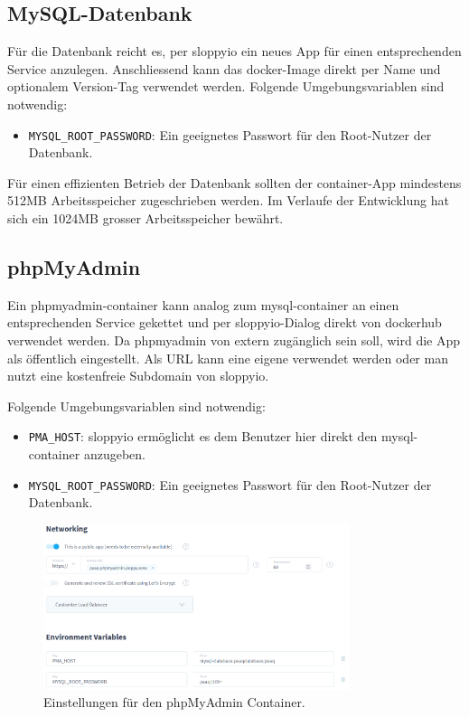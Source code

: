 \documentclass[../main.tex]{subfiles}
\begin{document}
	\subsection{MySQL-Datenbank}
	\par Für die Datenbank reicht es, per \gls{sloppyio} ein neues App für einen entsprechenden Service anzulegen. Anschliessend kann das \gls{docker}-Image direkt per Name und optionalem Version-Tag verwendet werden. Folgende Umgebungsvariablen sind notwendig:
	\begin{itemize}
		\item \texttt{MYSQL\_ROOT\_PASSWORD}: Ein geeignetes Passwort für den Root-Nutzer der Datenbank.
	\end{itemize}
	\par Für einen effizienten Betrieb der Datenbank sollten der \gls{container}-App mindestens 512MB Arbeitsspeicher zugeschrieben werden. Im Verlaufe der Entwicklung hat sich ein 1024MB grosser Arbeitsspeicher bewährt.
	
	\subsection{phpMyAdmin}
	\par Ein \gls{phpmyadmin}-\gls{container} kann analog zum \gls{mysql}-\gls{container} an einen entsprechenden Service gekettet und per \gls{sloppyio}-Dialog direkt von \gls{dockerhub} verwendet werden. Da \gls{phpmyadmin} von extern zugänglich sein soll, wird die App als öffentlich eingestellt. Als URL kann eine eigene verwendet werden oder man nutzt eine kostenfreie Subdomain von \gls{sloppyio}. 
	\par Folgende Umgebungsvariablen sind notwendig:
	\begin{itemize}
		\item \texttt{PMA\_HOST}: \gls{sloppyio} ermöglicht es dem Benutzer hier direkt den \gls{mysql}-\gls{container} anzugeben.
		\item \texttt{MYSQL\_ROOT\_PASSWORD}: Ein geeignetes Passwort für den Root-Nutzer der Datenbank.
	\end{itemize}
	
	\begin{figure}[H]
		\centering
		\includegraphics[width=0.8\textwidth]{../images/SloppyPHPPreferences} 
		\caption{Einstellungen für den phpMyAdmin Container.}
		\label{fig:SloppyPHPPreferences}
	\end{figure}
	
\end{document}
